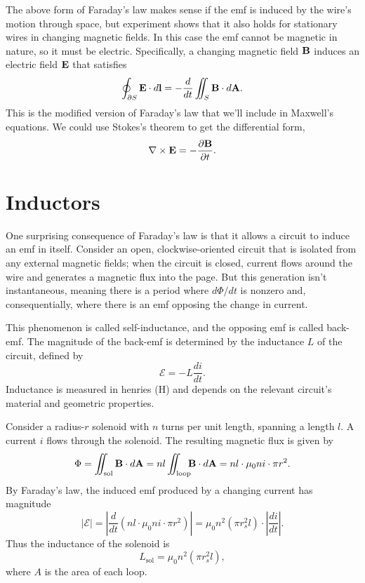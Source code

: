 \documentclass[../p051main.tex]{subfiles}
\begin{document}
The above form of Faraday's law makes sense if the emf is induced by the wire's motion through space, but experiment shows that it also holds for stationary wires in changing magnetic fields.
In this case the emf cannot be magnetic in nature, so it must be electric.
Specifically, a changing magnetic field $\mathbf{B}$ induces an electric field $\mathbf{E}$ that satisfies
\[ \oint_{\partial S} \mathbf{E} \cdot d\mathbf{l} = -\frac{d}{dt} \iint_S \mathbf{B} \cdot d\mathbf{A}. \]
This is the modified version of Faraday's law that we'll include in Maxwell's equations.
We could use Stokes's theorem to get the differential form,
\[ \nabla \times \mathbf{E} = -\frac{\partial \mathbf{B}}{\partial t}. \]

\section{Inductors}
One surprising consequence of Faraday's law is that it allows a circuit to induce an emf in itself.
Consider an open, clockwise-oriented circuit that is isolated from any external magnetic fields; when the circuit is closed, current flows around the wire and generates a magnetic flux into the page.
But this generation isn't instantaneous, meaning there is a period where $d\Phi / dt$ is nonzero and, consequentially, where there is an emf opposing the change in current.

This phenomenon is called self-inductance, and the opposing emf is called back-emf.
The magnitude of the back-emf is determined by the inductance $L$ of the circuit, defined by
\[ \mathcal{E} = -L \frac{di}{dt}. \]
Inductance is measured in henries (H) and depends on the relevant circuit's material and geometric properties.

\begin{example}
    Consider a radius-$r$ solenoid with $n$ turns per unit length, spanning a length $l$.
    A current $i$ flows through the solenoid.
    The resulting magnetic flux is given by
    \[ \Phi = \iint_\textrm{sol} \mathbf{B} \cdot d\mathbf{A} = nl \iint_\textrm{loop} \hspace{-5pt} \mathbf{B} \cdot d\mathbf{A} = nl \cdot \mu_0 ni \cdot \pi r^2. \]
    By Faraday's law, the induced emf produced by a changing current has magnitude
    \[ |\mathcal{E}| = \left| \frac{d}{dt} \left( nl \cdot \mu_0 ni \cdot \pi r^2 \right) \right| = \mu_0 n^2 (\pi r_s^2 l) \cdot \left| \frac{di}{dt} \right|. \]
    Thus the inductance of the solenoid is
    \[ L_\textrm{sol} = \mu_0 n^2 \left( \pi r_s^2 l \right), \]
    where $A$ is the area of each loop.
\end{example}
\end{document}
